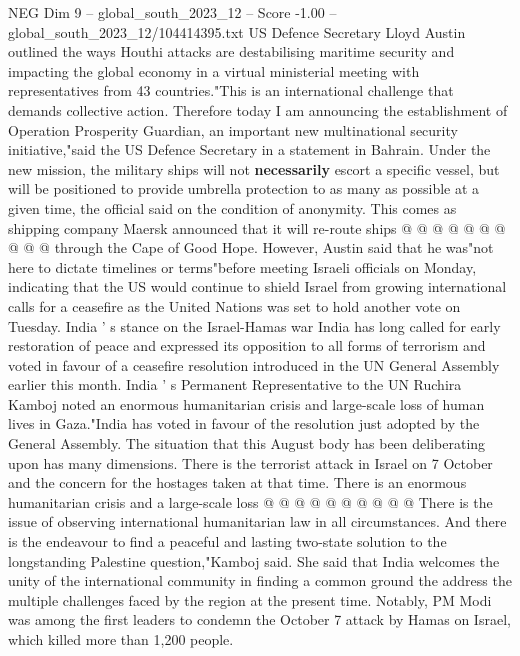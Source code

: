 \begin{textsample}{NEG Dim 9 – global\_south\_2023\_12 – Score -1.00 – global\_south\_2023\_12/104414395.txt}
US Defence Secretary Lloyd Austin outlined the ways Houthi attacks are destabilising maritime security and impacting the global economy in a virtual ministerial meeting with representatives from 43 countries."This is an international challenge that demands collective action.
Therefore today I am announcing the establishment of Operation Prosperity Guardian, an important new multinational security initiative,"said the US Defence Secretary in a statement in Bahrain.
Under the new mission, the military ships will not \textbf{necessarily} escort a specific vessel, but will be positioned to provide umbrella protection to as many as possible at a given time, the official said on the condition of anonymity.
This comes as shipping company Maersk announced that it will re-route ships @ @ @ @ @ @ @ @ @ @ through the Cape of Good Hope.
However, Austin said that he was"not here to dictate timelines or terms"before meeting Israeli officials on Monday, indicating that the US would continue to shield Israel from growing international calls for a ceasefire as the United Nations was set to hold another vote on Tuesday.
India ' s stance on the Israel-Hamas war India has long called for early restoration of peace and expressed its opposition to all forms of terrorism and voted in favour of a ceasefire resolution introduced in the UN General Assembly earlier this month.
India ' s Permanent Representative to the UN Ruchira Kamboj noted an enormous humanitarian crisis and large-scale loss of human lives in Gaza."India has voted in favour of the resolution just adopted by the General Assembly.
The situation that this August body has been deliberating upon has many dimensions.
There is the terrorist attack in Israel on 7 October and the concern for the hostages taken at that time.
There is an enormous humanitarian crisis and a large-scale loss @ @ @ @ @ @ @ @ @ @ There is the issue of observing international humanitarian law in all circumstances.
And there is the endeavour to find a peaceful and lasting two-state solution to the longstanding Palestine question,"Kamboj said.
She said that India welcomes the unity of the international community in finding a common ground the address the multiple challenges faced by the region at the present time.
Notably, PM Modi was among the first leaders to condemn the October 7 attack by Hamas on Israel, which killed more than 1,200 people.

\end{textsample}
